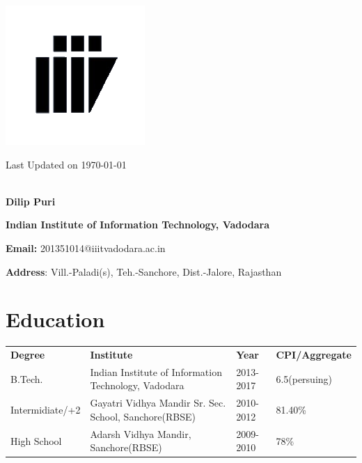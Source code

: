 \documentclass{article}
\begin{document}
\begin{minipage}{.1\textwidth}
\includegraphics[scale=0.6]{logo_iiitv.png}
\end{minipage}%
\begin{minipage}{1.5\textwidth}
\hspace*{12cm}Last Updated on \today \\ \\
\begin{large}
\hspace*{4cm}\textbf{Dilip Puri}\vspace*{2mm}

\hspace*{4cm}\textbf{Indian Institute of Information Technology, Vadodara}\vspace*{2mm}

\hspace*{4cm}\textbf{Email:} 201351014@iiitvadodara.ac.in\vspace*{2mm}

\hspace*{4cm}\textbf{Address}: Vill.-Paladi(s), Teh.-Sanchore, Dist.-Jalore, Rajasthan
\end{large}    
\end{minipage}

\section{Education}
\begin{tabular}{llll}
\textbf{Degree}&\textbf{Institute}&\textbf{Year}&\textbf{CPI/Aggregate}\vspace*{1mm} \\
B.Tech.& Indian Institute of Information Technology, Vadodara & 2013-2017 & 6.5(persuing)\\
Intermidiate/+2 & Gayatri Vidhya Mandir Sr. Sec. School, Sanchore(RBSE) & 2010-2012 & 81.40\%\\
High School & Adarsh Vidhya Mandir, Sanchore(RBSE) & 2009-2010 & 78\%\\
\end{tabular}
\end{document}
